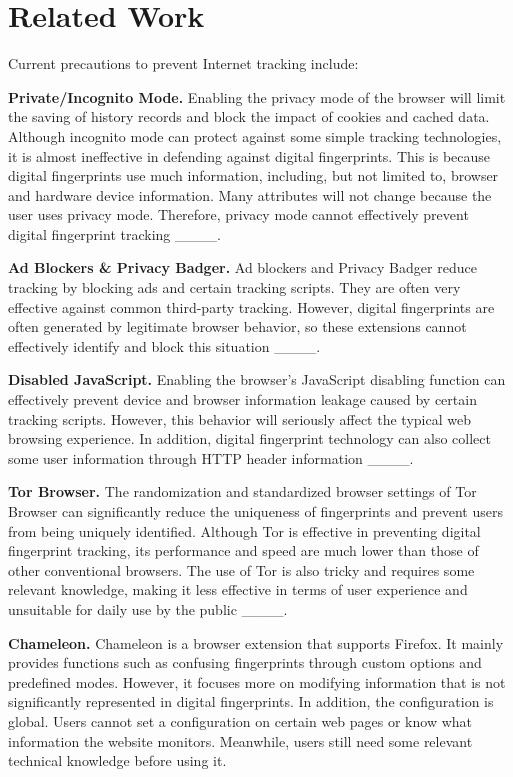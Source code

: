 \section{Related Work}
Current precautions to prevent Internet tracking include:

\textbf{Private/Incognito Mode.} Enabling the privacy mode of the browser will limit the saving of history records and block the impact of cookies and cached data. Although incognito mode can protect against some simple tracking technologies, it is almost ineffective in defending against digital fingerprints. This is because digital fingerprints use much information, including, but not limited to, browser and hardware device information. Many attributes will not change because the user uses privacy mode. Therefore, privacy mode cannot effectively prevent digital fingerprint tracking ____.

\textbf{Ad Blockers \& Privacy Badger.} Ad blockers and Privacy Badger reduce tracking by blocking ads and certain tracking scripts. They are often very effective against common third-party tracking. However, digital fingerprints are often generated by legitimate browser behavior, so these extensions cannot effectively identify and block this situation ____.

\textbf{Disabled JavaScript.} Enabling the browser's JavaScript disabling function can effectively prevent device and browser information leakage caused by certain tracking scripts. However, this behavior will seriously affect the typical web browsing experience. In addition, digital fingerprint technology can also collect some user information through HTTP header information ____.

\textbf{Tor Browser.} The randomization and standardized browser settings of Tor Browser can significantly reduce the uniqueness of fingerprints and prevent users from being uniquely identified. Although Tor is effective in preventing digital fingerprint tracking, its performance and speed are much lower than those of other conventional browsers. The use of Tor is also tricky and requires some relevant knowledge, making it less effective in terms of user experience and unsuitable for daily use by the public ____. 

\textbf{Chameleon.} Chameleon is a browser extension that supports Firefox. It mainly provides functions such as confusing fingerprints through custom options and predefined modes. However, it focuses more on modifying information that is not significantly represented in digital fingerprints. In addition, the configuration is global. Users cannot set a configuration on certain web pages or know what information the website monitors. Meanwhile, users still need some relevant technical knowledge before using it.